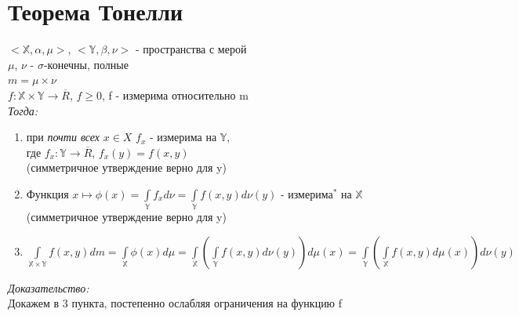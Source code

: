 \documentclass[paper=a4, fontsize=17pt]{article}
\begin{document}
\section{Теорема Тонелли}
$<\mathds{X}, \alpha, \mu>$, $<\mathds{Y}, \beta, \nu>$ - пространства с мерой\\
$\mu$, $\nu$ - $\sigma$-конечны, полные \\
$m = \mu \times \nu$ \\
$f: \mathds{X} \times \mathds{Y} \rightarrow \overline{R}$, $f \geq 0$, f - измерима относительно m \\
\emph{Тогда:}
\begin{enumerate}
	\item при \textit{почти всех} $x \in X$ $f_x$ - измерима на $\mathds{Y}$, \\
	 где $f_x : \mathds{Y} \rightarrow \overline{R}$, $f_x(y) = f(x, y)$ \\
	 (симметричное утверждение верно для y)
	 \item Функция $x \mapsto \phi(x) = \int\limits_{\mathds{Y}}f_x d\nu = \int\limits_{\mathds{Y}}f(x, y) d\nu(y) $ - $\text{измерима}^{\text{*}}$ на $\mathds{X}$ \\
	 (симметричное утверждение верно для y)
	 \item $\int\limits_{\mathds{X} \times \mathds{Y}}f(x, y)dm = \int\limits_{\mathds{X}}\phi(x)d\mu = \int\limits_{\mathds{X}}(\int\limits_{\mathds{Y}} f(x, y)d\nu(y))d\mu(x) = \int\limits_{\mathds{Y}}(\int\limits_{\mathds{X}}f(x,y)d\mu(x))d\nu(y)$
\end{enumerate}
\emph{Доказательство:} \\
Докажем в 3 пункта, постепенно ослабляя ограничения на функцию f
\end{document}
